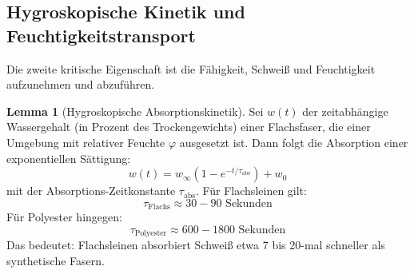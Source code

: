 \documentclass[a4paper,12pt]{article}
\theoremstyle{definition}
\newtheorem{lemma}{Lemma}
\begin{document}
\subsection{Hygroskopische Kinetik und Feuchtigkeitstransport}

Die zweite kritische Eigenschaft ist die Fähigkeit, Schweiß und Feuchtigkeit aufzunehmen und abzuführen.

\begin{lemma}[Hygroskopische Absorptionskinetik]
Sei $w(t)$ der zeitabhängige Wassergehalt (in Prozent des Trockengewichts) einer Flachsfaser, die einer Umgebung mit relativer Feuchte $\varphi$ ausgesetzt ist. Dann folgt die Absorption einer exponentiellen Sättigung:
\[
w(t) = w_{\infty}(1 - e^{-t/\tau_{\text{abs}}}) + w_0
\]
mit der Absorptions-Zeitkonstante $\tau_{\text{abs}}$. Für Flachsleinen gilt:
\[
\tau_{\text{Flachs}} \approx 30{-}90 \text{ Sekunden}
\]
Für Polyester hingegen:
\[
\tau_{\text{Polyester}} \approx 600{-}1800 \text{ Sekunden}
\]
Das bedeutet: Flachsleinen absorbiert Schweiß etwa 7 bis 20-mal schneller als synthetische Fasern.
\end{lemma}
\end{document}
